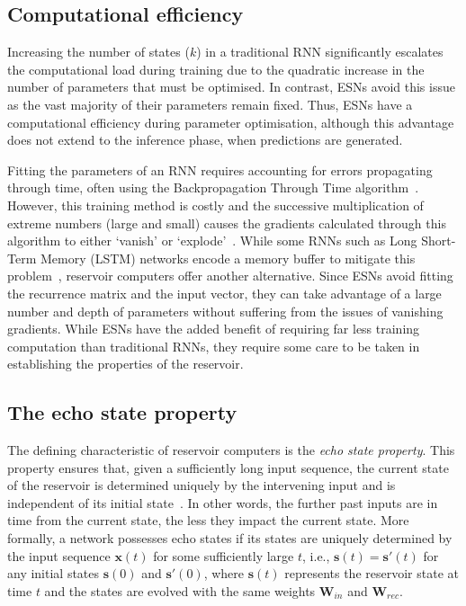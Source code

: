 \subsection{Computational efficiency}

Increasing the number of states ($k$) in a traditional RNN significantly escalates the computational load during training due to the quadratic increase in the number of parameters that must be optimised. In contrast, ESNs avoid this issue as the vast majority of their parameters remain fixed. Thus, ESNs have a computational efficiency during parameter optimisation, although this advantage does not extend to the inference phase, when predictions are generated.

Fitting the parameters of an RNN requires accounting for errors propagating through time, often using the Backpropagation Through Time algorithm~\cite{lukosevicius_and_jaeger_2009}. However, this training method is costly and the successive multiplication of extreme numbers (large and small) causes the gradients calculated through this algorithm to either `vanish' or `explode'~\cite{lukosevicius_and_jaeger_2009}. While some RNNs such as Long Short-Term Memory (LSTM) networks encode a memory buffer to mitigate this problem~\cite{hochreiter_1997}, reservoir computers offer another alternative. Since ESNs avoid fitting the recurrence matrix and the input vector, they can take advantage of a large number and depth of parameters without suffering from the issues of vanishing gradients. While ESNs have the added benefit of requiring far less training computation than traditional RNNs, they require some care to be taken in establishing the properties of the reservoir.

\subsection{The echo state property}

The defining characteristic of reservoir computers is the \textit{echo state property}. This property ensures that, given a sufficiently long input sequence, the current state of the reservoir is determined uniquely by the intervening input and is independent of its initial state~\cite{jaeger_2001}. In other words, the further past inputs are in time from the current state, the less they impact the current state. More formally, a network possesses echo states if its states are uniquely determined by the input sequence $\mathbf{x}(t)$ for some sufficiently large $t$, i.e., $\mathbf{s}(t) = \mathbf{s}'(t)$ for any initial states $\mathbf{s}(0)$ and $\mathbf{s}'(0)$, where $\mathbf{s}(t)$ represents the reservoir state at time $t$ and the states are evolved with the same weights $\mathbf{W}_{in}$ and $\mathbf{W}_{rec}$.

